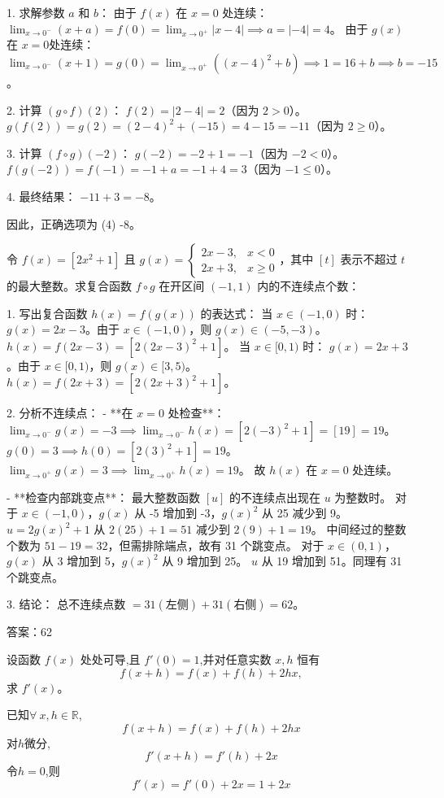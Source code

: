 \begin{questions}
\begin{solution}
1. 求解参数 $a$ 和 $b$：
由于 $f(x)$ 在 $x=0$ 处连续：
$\lim_{x \to 0^-} (x + a) = f(0) = \lim_{x \to 0^+} |x - 4| \implies a = |-4| = 4$。
由于 $g(x)$ 在 $x=0$处连续：
$\lim_{x \to 0^-} (x + 1) = g(0) = \lim_{x \to 0^+} ((x - 4)^2 + b) \implies 1 = 16 + b \implies b = -15$。

2. 计算 $(g \circ f)(2)$：
$f(2) = |2 - 4| = 2$（因为 $2 > 0$）。
$g(f(2)) = g(2) = (2 - 4)^2 + (-15) = 4 - 15 = -11$（因为 $2 \geq 0$）。

3. 计算 $(f \circ g)(-2)$：
$g(-2) = -2 + 1 = -1$（因为 $-2 < 0$）。
$f(g(-2)) = f(-1) = -1 + a = -1 + 4 = 3$（因为 $-1 \leq 0$）。

4. 最终结果：
$-11 + 3 = -8$。

因此，正确选项为 (4) -8。
\end{solution}

\question 
令 $f(x) = [2x^2 + 1]$ 且 $g(x) = \begin{cases} 2x - 3, & x < 0 \\ 2x + 3, & x \geq 0 \end{cases}$，其中 $[t]$ 表示不超过 $t$ 的最大整数。求复合函数 $f \circ g$ 在开区间 $(-1, 1)$ 内的不连续点个数：

\begin{solution}
1. 写出复合函数 $h(x) = f(g(x))$ 的表达式：
当 $x \in (-1, 0)$ 时：
$g(x) = 2x - 3$。由于 $x \in (-1, 0)$，则 $g(x) \in (-5, -3)$。
$h(x) = f(2x - 3) = [2(2x - 3)^2 + 1]$。
当 $x \in [0, 1)$ 时：
$g(x) = 2x + 3$。由于 $x \in [0, 1)$，则 $g(x) \in [3, 5)$。
$h(x) = f(2x + 3) = [2(2x + 3)^2 + 1]$。

2. 分析不连续点：
- **在 $x = 0$ 处检查**：
  $\lim_{x \to 0^-} g(x) = -3 \implies \lim_{x \to 0^-} h(x) = [2(-3)^2 + 1] = [19] = 19$。
  $g(0) = 3 \implies h(0) = [2(3)^2 + 1] = 19$。
  $\lim_{x \to 0^+} g(x) = 3 \implies \lim_{x \to 0^+} h(x) = 19$。
  故 $h(x)$ 在 $x=0$ 处连续。

- **检查内部跳变点**：
  最大整数函数 $[u]$ 的不连续点出现在 $u$ 为整数时。
  对于 $x \in (-1, 0)$，$g(x)$ 从 -5 增加到 -3，$g(x)^2$ 从 25 减少到 9。
  $u = 2g(x)^2 + 1$ 从 $2(25)+1=51$ 减少到 $2(9)+1=19$。
  中间经过的整数个数为 $51 - 19 = 32$，但需排除端点，故有 31 个跳变点。
  对于 $x \in (0, 1)$，$g(x)$ 从 3 增加到 5，$g(x)^2$ 从 9 增加到 25。
  $u$ 从 19 增加到 51。同理有 31 个跳变点。

3. 结论：
总不连续点数 $= 31 (\text{左侧}) + 31 (\text{右侧}) = 62$。

答案：62
\end{solution}
    \question 设函数 \( f(x) \) 处处可导,且 \( f'(0) = 1 \),并对任意实数 \( x,h \) 恒有
    \[
    f(x + h) = f(x) + f(h) + 2hx,
    \]
    求 \( f'(x) \)。
    \begin{solution}
        已知$\forall \:x,h \in \mathbb{R}$,
        \[
        f(x + h) = f(x) + f(h) + 2hx
        \]
        对$h$微分,
        \[
        f'(x+h)=f'(h)+2x
        \]
        令$h=0$,则
        \[
        f'(x)=f'(0)+2x=1+2x
        \]
    \end{solution}


\end{questions}
